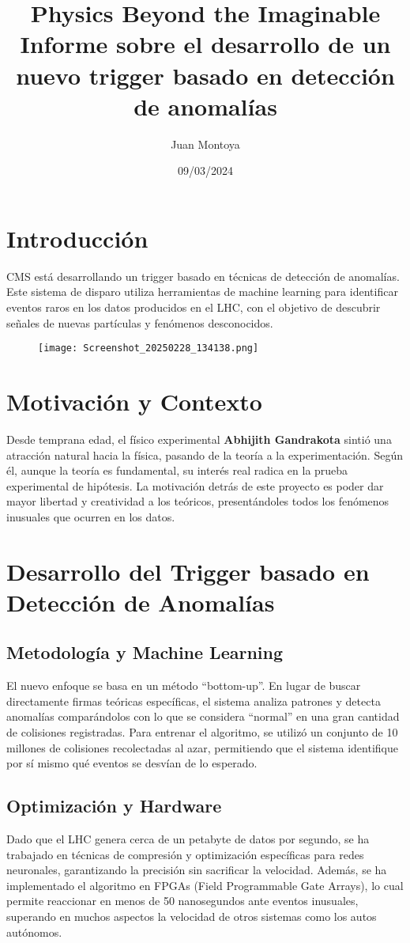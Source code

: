 \documentclass[a4paper,12pt]{article}
\title{Physics Beyond the Imaginable\\[0.5em]
\large Informe sobre el desarrollo de un nuevo trigger basado en detección de anomalías}
\author{Juan Montoya}
\date{09/03/2024}
\begin{document}
\maketitle

\section{Introducción}
CMS está desarrollando un trigger basado en técnicas de detección de anomalías. Este sistema de disparo utiliza herramientas de machine learning para identificar eventos raros en los datos producidos en el LHC, con el objetivo de descubrir señales de nuevas partículas y fenómenos desconocidos.

\begin{figure}[h]
    \centering
    \texttt{[image: Screenshot\_20250228\_134138.png]}
\end{figure}

\section{Motivación y Contexto}
Desde temprana edad, el físico experimental \textbf{Abhijith Gandrakota} sintió una atracción natural hacia la física, pasando de la teoría a la experimentación. Según él, aunque la teoría es fundamental, su interés real radica en la prueba experimental de hipótesis. La motivación detrás de este proyecto es poder dar mayor libertad y creatividad a los teóricos, presentándoles todos los fenómenos inusuales que ocurren en los datos.

\section{Desarrollo del Trigger basado en Detección de Anomalías}
\subsection{Metodología y Machine Learning}
El nuevo enfoque se basa en un método ``bottom-up''. En lugar de buscar directamente firmas teóricas específicas, el sistema analiza patrones y detecta anomalías comparándolos con lo que se considera ``normal'' en una gran cantidad de colisiones registradas. Para entrenar el algoritmo, se utilizó un conjunto de 10 millones de colisiones recolectadas al azar, permitiendo que el sistema identifique por sí mismo qué eventos se desvían de lo esperado.

\subsection{Optimización y Hardware}
Dado que el LHC genera cerca de un petabyte de datos por segundo, se ha trabajado en técnicas de compresión y optimización específicas para redes neuronales, garantizando la precisión sin sacrificar la velocidad. Además, se ha implementado el algoritmo en FPGAs (Field Programmable Gate Arrays), lo cual permite reaccionar en menos de 50 nanosegundos ante eventos inusuales, superando en muchos aspectos la velocidad de otros sistemas como los autos autónomos.
\end{document}
